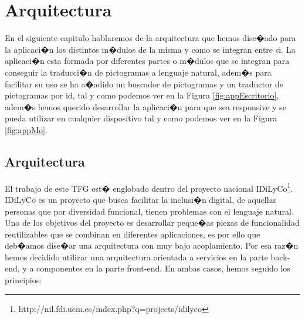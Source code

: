
\chapter{Arquitectura}
\label{cap:Arquitectura}

En el siguiente capitulo hablaremos de la arquitectura que hemos dise�ado para la aplicaci�n los distintos m�dulos de la misma y como se integran entre si. La aplicaci�n esta formada por diferentes partes o m�dulos que se integran para conseguir la traducci�n de pictogramas a lenguaje natural, adem�s para facilitar su uso se ha a�adido un buscador de pictogramas y un traductor de pictogramas por id, tal y como podemos ver en la Figura \ref{fig:appEscritorio}, adem�s hemos querido desarrollar la aplicaci�n para que sea responsive y se pueda utilizar en cualquier dispositivo tal y como podemos ver en la Figura \ref{fig:appMo}.
\section{Arquitectura}
\label{cap5:sec:Arquitectura}

El trabajo de este TFG est� englobado dentro del proyecto nacional IDiLyCo\footnote{http://nil.fdi.ucm.es/index.php?q=projects/idilyco}. IDiLyCo es un proyecto que busca facilitar la inclusi�n digital, de aquellas personas que por diversidad   funcional, tienen problemas con el lenguaje natural. Uno de los objetivos del proyecto es desarrollar peque�as piezas de funcionalidad reutilizables que se combinan en diferentes aplicaciones, es por ello que  deb�amos dise�ar una arquitectura con muy bajo acoplamiento. Por esa raz�n hemos decidido utilizar una arquitectura orientada a servicios en la parte back-end, y a componentes en la parte front-end. En ambas casos, hemos seguido los principios\citep{martin2013agile}: 

